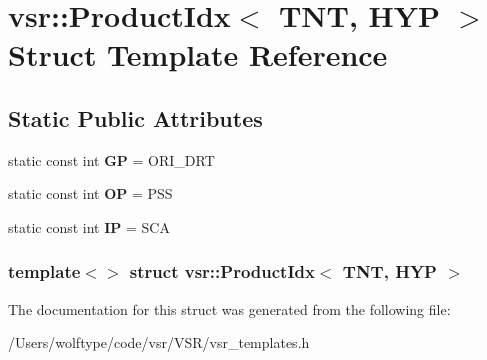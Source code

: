 \hypertarget{structvsr_1_1_product_idx_3_01_t_n_t_00_01_h_y_p_01_4}{\section{vsr\-:\-:Product\-Idx$<$ T\-N\-T, H\-Y\-P $>$ Struct Template Reference}
\label{structvsr_1_1_product_idx_3_01_t_n_t_00_01_h_y_p_01_4}
}
\subsection*{Static Public Attributes}
\begin{DoxyCompactItemize}
\item 
\hypertarget{structvsr_1_1_product_idx_3_01_t_n_t_00_01_h_y_p_01_4_a0e9287b8297a5ed58dce5831665c5b1f}{static const int {\bfseries G\-P} = O\-R\-I\-\_\-\-D\-R\-T}\label{structvsr_1_1_product_idx_3_01_t_n_t_00_01_h_y_p_01_4_a0e9287b8297a5ed58dce5831665c5b1f}

\item 
\hypertarget{structvsr_1_1_product_idx_3_01_t_n_t_00_01_h_y_p_01_4_a579ecd4ceb7729678a8f7b000b9d76d2}{static const int {\bfseries O\-P} = P\-S\-S}\label{structvsr_1_1_product_idx_3_01_t_n_t_00_01_h_y_p_01_4_a579ecd4ceb7729678a8f7b000b9d76d2}

\item 
\hypertarget{structvsr_1_1_product_idx_3_01_t_n_t_00_01_h_y_p_01_4_ada279a794bff771ef568b4f3f73cf27a}{static const int {\bfseries I\-P} = S\-C\-A}\label{structvsr_1_1_product_idx_3_01_t_n_t_00_01_h_y_p_01_4_ada279a794bff771ef568b4f3f73cf27a}

\end{DoxyCompactItemize}
\subsubsection*{template$<$$>$ struct vsr\-::\-Product\-Idx$<$ T\-N\-T, H\-Y\-P $>$}



The documentation for this struct was generated from the following file\-:\begin{DoxyCompactItemize}
\item 
/\-Users/wolftype/code/vsr/\-V\-S\-R/vsr\-\_\-templates.\-h\end{DoxyCompactItemize}

